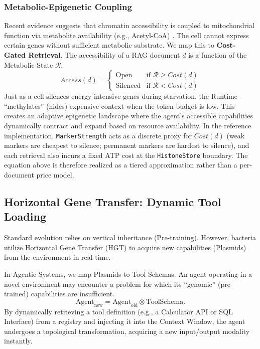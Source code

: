 \subsubsection{Metabolic-Epigenetic Coupling}

Recent evidence suggests that chromatin accessibility is coupled to mitochondrial function via metabolite
availability (e.g., Acetyl-CoA) \cite{chandel2024mitochondria}. The cell cannot express certain genes without
sufficient metabolic substrate. We map this to \textbf{Cost-Gated Retrieval}. The accessibility of a RAG
document $d$ is a function of the Metabolic State $\mathcal{R}$:
\begin{equation}
Access(d) =
\begin{cases}
  \text{Open} & \text{if } \mathcal{R} \ge Cost(d) \\
  \text{Silenced} & \text{if } \mathcal{R} < Cost(d)
\end{cases}
\label{eq:cost-gated-retrieval}
\end{equation}
Just as a cell silences energy-intensive genes during starvation, the Runtime ``methylates'' (hides) expensive
context when the token budget is low. This creates an adaptive epigenetic landscape where the agent's accessible
capabilities dynamically contract and expand based on resource availability. In the reference implementation,
\texttt{MarkerStrength} acts as a discrete proxy for $Cost(d)$ (weak markers are cheapest to silence; permanent
markers are hardest to silence), and each retrieval also incurs a fixed ATP cost at the \texttt{HistoneStore}
boundary. The equation above is therefore realized as a tiered approximation rather than a per-document price model.

\subsection{Horizontal Gene Transfer: Dynamic Tool Loading}

Standard evolution relies on vertical inheritance (Pre-training). However, bacteria utilize Horizontal Gene
Transfer (HGT) to acquire new capabilities (Plasmids) from the environment in real-time.

In Agentic Systems, we map Plasmids to Tool Schemas. An agent operating in a novel environment may encounter a
problem for which its ``genomic'' (pre-trained) capabilities are insufficient.
\begin{equation}
\mathrm{Agent}_{\text{new}} = \mathrm{Agent}_{\text{old}} \otimes \mathrm{ToolSchema}.
\label{eq:horizontal-gene-transfer}
\end{equation}
By dynamically retrieving a tool definition (e.g., a Calculator API or SQL Interface) from a registry and
injecting it into the Context Window, the agent undergoes a topological transformation, acquiring a new
input/output modality instantly.


